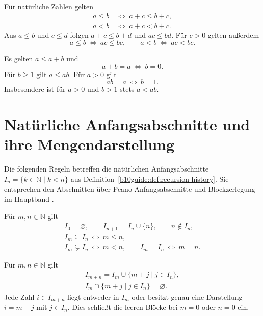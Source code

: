 \begin{theorem}
\label{b10guide:thm:arithmetic-order}
Für natürliche Zahlen gelten
\[
 \begin{aligned}
 a\le b&\ \Longleftrightarrow\ a+c\le b+c,\\
 a<b&\ \Longleftrightarrow\ a+c<b+c.
 \end{aligned}
\]
Aus $a\le b$ und $c\le d$ folgen $a+c\le b+d$ und $ac\le bd$.
Für $c>0$ gelten außerdem
\[
 a\le b\ \Longleftrightarrow\ ac\le bc,
 \qquad
 a<b\ \Longleftrightarrow\ ac<bc.
\]
\end{theorem}

\begin{theorem}
\label{b10guide:thm:arithmetic-bounds}
Es gelten $a\le a+b$ und
\[
 a+b=a\ \Longleftrightarrow\ b=0.
\]
Für $b\ge1$ gilt $a\le ab$. Für $a>0$ gilt
\[
 ab=a\ \Longleftrightarrow\ b=1.
\]
Insbesondere ist für $a>0$ und $b>1$ stets $a<ab$.
\end{theorem}

\section{Natürliche Anfangsabschnitte und ihre Mengendarstellung}

Die folgenden Regeln betreffen die natürlichen Anfangsabschnitte
$I_n=\{k\in\mathbb N\mid k<n\}$ aus
Definition~\ref{b10guide:def:recursion-history}.
Sie entsprechen den Abschnitten über Peano-Anfangsabschnitte und
Blockzerlegung im Hauptband \cite{project}.

\begin{theorem}
\label{b10guide:thm:initial-segments}
Für $m,n\in\mathbb N$ gilt
\[
 \begin{gathered}
 I_0=\varnothing,\qquad I_{n+1}=I_n\cup\{n\},\qquad n\notin I_n,\\
 I_m\subseteq I_n\ \Longleftrightarrow\ m\le n,\\
 I_m\subsetneq I_n\ \Longleftrightarrow\ m<n,\qquad
 I_m=I_n\ \Longleftrightarrow\ m=n.
 \end{gathered}
\]
\end{theorem}

\begin{theorem}
\label{b10guide:thm:initial-blocks}
Für $m,n\in\mathbb N$ gilt
\[
 \begin{gathered}
 I_{m+n}=I_m\cup\{m+j\mid j\in I_n\},\\
 I_m\cap\{m+j\mid j\in I_n\}=\varnothing.
 \end{gathered}
\]
Jede Zahl $i\in I_{m+n}$ liegt entweder in $I_m$ oder besitzt
genau eine Darstellung $i=m+j$ mit $j\in I_n$.
Dies schließt die leeren Blöcke bei $m=0$ oder $n=0$ ein.
\end{theorem}

